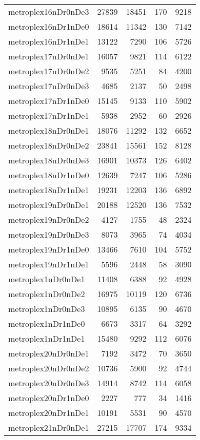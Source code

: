 \begin{longtable}{lrrrr}
metroplex16nDr0nDe3 & 27839 & 18451 & 170 & 9218 \\
metroplex16nDr1nDe0 & 18614 & 11342 & 130 & 7142 \\
metroplex16nDr1nDe1 & 13122 & 7290 & 106 & 5726 \\
metroplex17nDr0nDe1 & 16057 & 9821 & 114 & 6122 \\
metroplex17nDr0nDe2 & 9535 & 5251 & 84 & 4200 \\
metroplex17nDr0nDe3 & 4685 & 2137 & 50 & 2498 \\
metroplex17nDr1nDe0 & 15145 & 9133 & 110 & 5902 \\
metroplex17nDr1nDe1 & 5938 & 2952 & 60 & 2926 \\
metroplex18nDr0nDe1 & 18076 & 11292 & 132 & 6652 \\
metroplex18nDr0nDe2 & 23841 & 15561 & 152 & 8128 \\
metroplex18nDr0nDe3 & 16901 & 10373 & 126 & 6402 \\
metroplex18nDr1nDe0 & 12639 & 7247 & 106 & 5286 \\
metroplex18nDr1nDe1 & 19231 & 12203 & 136 & 6892 \\
metroplex19nDr0nDe1 & 20188 & 12520 & 136 & 7532 \\
metroplex19nDr0nDe2 & 4127 & 1755 & 48 & 2324 \\
metroplex19nDr0nDe3 & 8073 & 3965 & 74 & 4034 \\
metroplex19nDr1nDe0 & 13466 & 7610 & 104 & 5752 \\
metroplex19nDr1nDe1 & 5596 & 2448 & 58 & 3090 \\
metroplex1nDr0nDe1 & 11408 & 6388 & 92 & 4928 \\
metroplex1nDr0nDe2 & 16975 & 10119 & 120 & 6736 \\
metroplex1nDr0nDe3 & 10895 & 6135 & 90 & 4670 \\
metroplex1nDr1nDe0 & 6673 & 3317 & 64 & 3292 \\
metroplex1nDr1nDe1 & 15480 & 9292 & 112 & 6076 \\
metroplex20nDr0nDe1 & 7192 & 3472 & 70 & 3650 \\
metroplex20nDr0nDe2 & 10736 & 5900 & 92 & 4744 \\
metroplex20nDr0nDe3 & 14914 & 8742 & 114 & 6058 \\
metroplex20nDr1nDe0 & 2227 & 777 & 34 & 1416 \\
metroplex20nDr1nDe1 & 10191 & 5531 & 90 & 4570 \\
metroplex21nDr0nDe1 & 27215 & 17707 & 174 & 9334 \\

\end{longtable}
